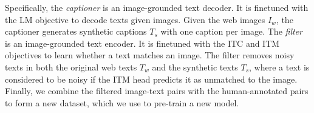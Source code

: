 Specifically,
the \emph{captioner} is an image-grounded text decoder.
It is finetuned with the LM objective to decode texts given images. 
Given the web images $I_w$, the captioner generates synthetic captions $T_s$ with one caption per image.
The \emph{filter} is an image-grounded text encoder.
It is finetuned with the ITC and ITM objectives to learn whether a text matches an image.
The filter removes noisy texts in both the original web texts $T_w$ and the synthetic texts $T_s$,
where a text is considered to be noisy if the ITM head predicts it as unmatched to the image.
Finally,
we combine the filtered image-text pairs with the human-annotated pairs to form a new dataset,
which we use to pre-train a new model.












